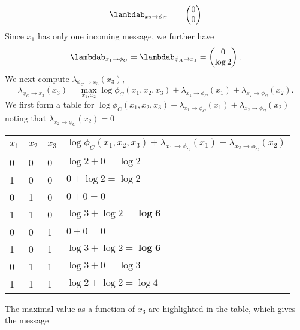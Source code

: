 \begin{exenumerate}
\begin{solution}
\begin{align}
          &
           \lambdab_{x_2 \to \phi_C} & = \begin{pmatrix}
          0\\
          0
        \end{pmatrix}
        \end{align}
        Since $x_1$ has only one incoming message, we further have
        \begin{equation}
          \lambdab_{x_1 \to \phi_C} = \lambdab_{\phi_A \to x_1} =  \begin{pmatrix}
            0\\
            \log 2
          \end{pmatrix}.
        \end{equation}
       We next compute $\lambda_{\phi_C \to x_3}(x_3)$,
       \begin{equation}
         \lambda_{\phi_C \to x_3}(x_3) = \max_{x_1, x_2} \log \phi_C(x_1,x_2,x_3) + \lambda_{x_1 \to \phi_C}(x_1) + \lambda_{x_2 \to \phi_C}(x_2).
       \end{equation}
       We first form a table for $ \log \phi_C(x_1,x_2,x_3) + \lambda_{x_1 \to \phi_C}(x_1) + \lambda_{x_2 \to \phi_C}(x_2)$ noting that $\lambda_{x_2 \to \phi_C}(x_2)=0$
       \begin{center}
         \begin{tabular}{llll}
          \toprule
          $x_1$ & $x_2$ & $x_3$ & $\log \phi_C(x_1,x_2,x_3) + \lambda_{x_1 \to \phi_C}(x_1) + \lambda_{x_2 \to \phi_C}(x_2)$  \\
          \midrule
          0 & 0 & 0 & $\log 2 + 0 = \log 2$ \\
          1 & 0 & 0 & $0+\log 2 = \log 2$ \\
          0 & 1 & 0 & $0+0 = 0$ \\
          1 & 1 & 0 & $\log 3+ \log 2 = \boldsymbol{\log 6}$ \\
          0 & 0 & 1 & $0+0 = 0 $ \\
          1 & 0 & 1 & $\log 3+ \log 2 = \boldsymbol{\log 6}$ \\
          0 & 1 & 1 & $\log 3+0 = \log 3$ \\
          1 & 1 & 1 & $\log 2+\log 2 = \log 4$ \\
          \bottomrule
        \end{tabular}
       \end{center}
       The maximal value as a function of $x_3$ are highlighted in the table, which gives the message
       \begin{equation}

\end{equation}
\end{solution}
\end{exenumerate}
